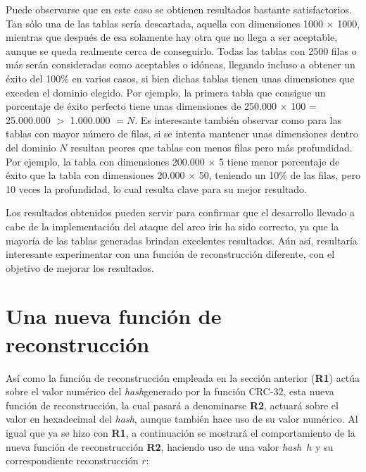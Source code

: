 \documentclass[12pt,spanish,listoffigures,listoftables]{tfgetsinf}
\newcommand{\hash}{\textit{hash}}
\begin{document}
Puede observarse que en este caso se obtienen resultados bastante satisfactorios. Tan sólo una de las tablas sería descartada, aquella con dimensiones 1000 $\times$ 1000, mientras que después de esa solamente hay otra que no llega a ser aceptable, aunque se queda realmente cerca de conseguirlo. Todas las tablas con 2500 filas o más serán consideradas como aceptables o idóneas, llegando incluso a obtener un éxito del 100\% en varios casos, si bien dichas tablas tienen unas dimensiones que exceden el dominio elegido. Por ejemplo, la primera tabla que consigue un porcentaje de éxito perfecto tiene unas dimensiones de 250.000 $\times$ 100 = 25.000.000 $>$ 1.000.000 $= N$. Es interesante también observar como para las tablas con mayor número de filas, si se intenta mantener unas dimensiones dentro del dominio $N$ resultan peores que tablas con menos filas pero más profundidad. Por ejemplo, la tabla con dimensiones 200.000 $\times$ 5 tiene menor porcentaje de éxito que la tabla con dimensiones 20.000 $\times$ 50, teniendo un 10\% de las filas, pero 10 veces la profundidad, lo cual resulta clave para su mejor resultado.

Los resultados obtenidos pueden servir para confirmar que el desarrollo llevado a cabe de la implementación del ataque del arco iris ha sido correcto, ya que la mayoría de las tablas generadas brindan excelentes resultados. Aún así, resultaría interesante experimentar con una función de reconstrucción diferente, con el objetivo de mejorar los resultados.

\section{Una nueva función de reconstrucción}

Así como la función de reconstrucción empleada en la sección anterior (\textbf{R1}) actúa sobre el valor numérico del \hash generado por la función CRC-32, esta nueva función de reconstrucción, la cual pasará a denominarse \textbf{R2}, actuará sobre el valor en hexadecimal del \hash, aunque también hace uso de su valor numérico. Al igual que ya se hizo con \textbf{R1}, a continuación se mostrará el comportamiento de la nueva función de reconstrucción \textbf{R2}, haciendo uso de una valor \hash~$h$ y su correspondiente reconstrucción $r$:
\end{document}
